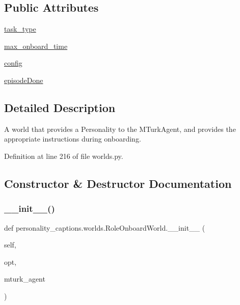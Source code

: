 \subsection*{Public Attributes}
\begin{DoxyCompactItemize}
\item 
\hyperlink{classpersonality__captions_1_1worlds_1_1RoleOnboardWorld_a6cf6206af24cf6a9402f23f620d4e365}{task\+\_\+type}
\item 
\hyperlink{classpersonality__captions_1_1worlds_1_1RoleOnboardWorld_aa6108733e26c2d1761e8155a65c2df12}{max\+\_\+onboard\+\_\+time}
\item 
\hyperlink{classpersonality__captions_1_1worlds_1_1RoleOnboardWorld_ade4545af6ba49e704c8df5d223c330f0}{config}
\item 
\hyperlink{classpersonality__captions_1_1worlds_1_1RoleOnboardWorld_a6f13341d6fc898dc7701a7e99133b885}{episode\+Done}
\end{DoxyCompactItemize}


\subsection{Detailed Description}
\begin{DoxyVerb}A world that provides a Personality to the MTurkAgent, and provides the appropriate
instructions during onboarding.
\end{DoxyVerb}
 

Definition at line 216 of file worlds.\+py.



\subsection{Constructor \& Destructor Documentation}
\mbox{\label{classpersonality__captions_1_1worlds_1_1RoleOnboardWorld_a7c26e32198909d8f4527ac967605adb0}} 
\subsubsection{\texorpdfstring{\+\_\+\+\_\+init\+\_\+\+\_\+()}{\_\_init\_\_()}}
{\footnotesize\ttfamily def personality\+\_\+captions.\+worlds.\+Role\+Onboard\+World.\+\_\+\+\_\+init\+\_\+\+\_\+ (\begin{DoxyParamCaption}\item[{}]{self,  }\item[{}]{opt,  }\item[{}]{mturk\+\_\+agent }\end{DoxyParamCaption})}



